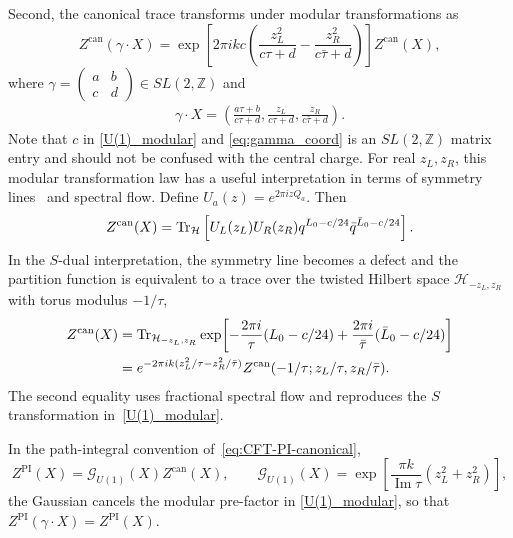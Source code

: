\documentclass[11pt]{article}
\numberwithin{equation}{section}
\begin{document}
Second, the canonical trace transforms under modular transformations as
\begin{equation}
Z^{\mathrm{can}}(\gamma\cdot X)
 =\exp\!\left[2\pi ikc
 \left(\frac{z_L^2}{c\tau+d}
       -\frac{z_R^2}{c\bar\tau+d}\right)\right]
 Z^{\mathrm{can}}(X),
\label{U(1)_modular}
\end{equation}
where $\gamma=\left(\begin{smallmatrix}a&b\\c&d\end{smallmatrix}\right)\in SL(2,\mathbb Z)$ and
\begin{align}
    \gamma\cdot X=\left(\frac{a\tau+b}{c\tau+d},\frac{z_L}{c\tau+d},\frac{z_R}{c\bar\tau+d} \right).
    \label{eq:gamma_coord}
\end{align}
Note that $c$ in  \eqref{U(1)_modular} and \eqref{eq:gamma_coord}  is an $SL(2,\mathbb Z)$ matrix entry and should not be confused with the central charge.  
For real $z_L,z_R$, this modular transformation law has a useful interpretation in terms of symmetry lines~\cite{Benjamin:2020swg} and spectral flow. Define $U_a(z)=e^{2\pi izQ_a}$. Then
\begin{equation}
Z^{\mathrm{can}}(X)=\operatorname{Tr}_{\mathcal H}
 \left[U_L(z_L)U_R(z_R)
 q^{L_0-c/24}\bar q^{\bar L_0-c/24}\right].
\label{U(1)_modular_eq1}
\end{equation}
In the $S$-dual interpretation, the symmetry line becomes a defect and the partition function is equivalent to a trace over the twisted Hilbert space $\mathcal{H}_{-z_L,z_R}$  with torus modulus  $-1/\tau$,
\begin{align}
Z^{\mathrm{can}}(X)&=\operatorname{Tr}_{\mathcal H_{-z_L,z_R}}
 \exp\!\left[-\frac{2\pi i}{\tau}(L_0-c/24)
             +\frac{2\pi i}{\bar\tau}(\bar L_0-c/24)\right]
\nonumber\\
&=e^{-2\pi ik(z_L^2/\tau-z_R^2/\bar\tau)}
 Z^{\mathrm{can}}(-1/\tau;z_L/\tau,z_R/\bar\tau)
 .
\label{U(1)_modular_eq2}
\end{align}
The second equality uses fractional spectral flow and reproduces the $S$ transformation in~\eqref{U(1)_modular}.

In the path-integral convention of~\eqref{eq:CFT-PI-canonical},
\begin{equation}
Z^{\mathrm{PI}}(X)=\mathcal G_{U(1)}(X)Z^{\mathrm{can}}(X),
\qquad \mathcal G_{U(1)}(X)
 =\exp\!\left[\frac{\pi k}{\operatorname{Im}\tau}(z_L^2+z_R^2)\right],
\end{equation}
the Gaussian cancels the modular pre-factor in \eqref{U(1)_modular}, so that $Z^{\mathrm{PI}}(\gamma\cdot X)=Z^{\mathrm{PI}}(X)$. 
\end{document}
